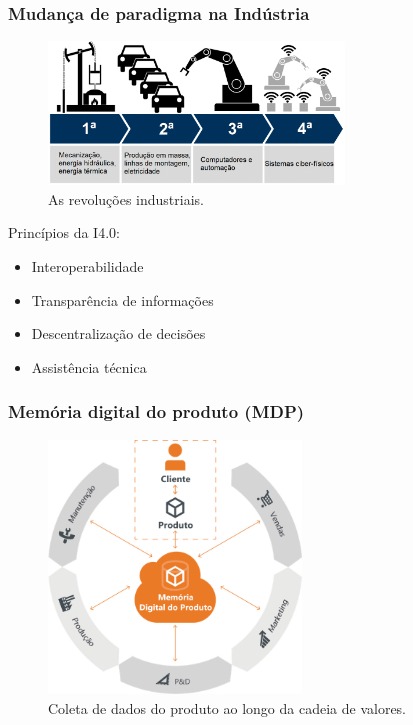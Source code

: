 \documentclass[10pt]{beamer}
\begin{document}
\begin{frame}
	
	\frametitle{Mudança de paradigma na Indústria}
	
	\begin{figure}[htb]
		\centering
		\caption{As revoluções industriais.}
		\label{fig:i4}
		\includegraphics[width=0.7\textwidth]{i4.png}
	\end{figure}

	Princípios da I4.0:
	\begin{itemize}
		\item Interoperabilidade
		\item Transparência de informações
		\item Descentralização de decisões
		\item Assistência técnica
	\end{itemize}
	
\end{frame}

\begin{frame}
	
	\frametitle{Memória digital do produto (MDP)}

	\begin{figure}[htb]
		\centering
		\caption{Coleta de dados do produto ao longo da cadeia de valores.}
		\label{fig:mdp}
		\includegraphics[width=0.6\textwidth]{mdp.png}
	\end{figure}
	 	
\end{frame}
\end{document}
